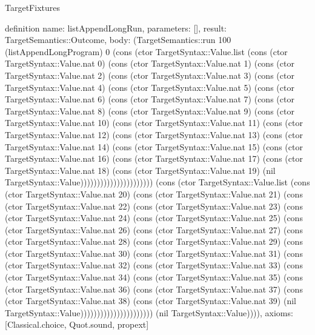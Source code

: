 \begin{lexlean}{TargetFixtures}
\begin{semanticmodule}
definition{
  name: listAppendLongRun,
  parameters: [],
  result: TargetSemantics::Outcome,
  body: (TargetSemantics::run 100 (listAppendLongProgram) 0 (cons (ctor TargetSyntax::Value.list (cons (ctor TargetSyntax::Value.nat 0) (cons (ctor TargetSyntax::Value.nat 1) (cons (ctor TargetSyntax::Value.nat 2) (cons (ctor TargetSyntax::Value.nat 3) (cons (ctor TargetSyntax::Value.nat 4) (cons (ctor TargetSyntax::Value.nat 5) (cons (ctor TargetSyntax::Value.nat 6) (cons (ctor TargetSyntax::Value.nat 7) (cons (ctor TargetSyntax::Value.nat 8) (cons (ctor TargetSyntax::Value.nat 9) (cons (ctor TargetSyntax::Value.nat 10) (cons (ctor TargetSyntax::Value.nat 11) (cons (ctor TargetSyntax::Value.nat 12) (cons (ctor TargetSyntax::Value.nat 13) (cons (ctor TargetSyntax::Value.nat 14) (cons (ctor TargetSyntax::Value.nat 15) (cons (ctor TargetSyntax::Value.nat 16) (cons (ctor TargetSyntax::Value.nat 17) (cons (ctor TargetSyntax::Value.nat 18) (cons (ctor TargetSyntax::Value.nat 19) (nil TargetSyntax::Value)))))))))))))))))))))) (cons (ctor TargetSyntax::Value.list (cons (ctor TargetSyntax::Value.nat 20) (cons (ctor TargetSyntax::Value.nat 21) (cons (ctor TargetSyntax::Value.nat 22) (cons (ctor TargetSyntax::Value.nat 23) (cons (ctor TargetSyntax::Value.nat 24) (cons (ctor TargetSyntax::Value.nat 25) (cons (ctor TargetSyntax::Value.nat 26) (cons (ctor TargetSyntax::Value.nat 27) (cons (ctor TargetSyntax::Value.nat 28) (cons (ctor TargetSyntax::Value.nat 29) (cons (ctor TargetSyntax::Value.nat 30) (cons (ctor TargetSyntax::Value.nat 31) (cons (ctor TargetSyntax::Value.nat 32) (cons (ctor TargetSyntax::Value.nat 33) (cons (ctor TargetSyntax::Value.nat 34) (cons (ctor TargetSyntax::Value.nat 35) (cons (ctor TargetSyntax::Value.nat 36) (cons (ctor TargetSyntax::Value.nat 37) (cons (ctor TargetSyntax::Value.nat 38) (cons (ctor TargetSyntax::Value.nat 39) (nil TargetSyntax::Value)))))))))))))))))))))) (nil TargetSyntax::Value)))),
  axioms: [Classical.choice, Quot.sound, propext]
}


\end{semanticmodule}
\end{lexlean}
